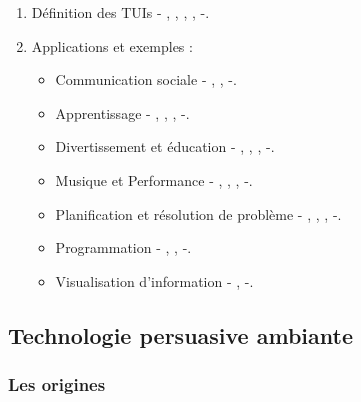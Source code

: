\documentclass[10pt,a5paper,twoside]{article}
\begin{document}
\begin{enumerate}
\def\labelenumi{\arabic{enumi}.}
\item
  Définition des TUIs - \citet{wellner1993back},
  \citet{fitzmaurice1995bricks}, \citet{ishii1997tangible},
  \citet{ullmer2000emerging}, \citet{shaer2010tangible} -.
\item
  Applications et exemples :

  \begin{itemize}
  \itemsep1pt\parskip0pt
  \item
    Communication sociale - \citet{werner2008unitedpulse},
    \citet{ernevi2005interactive}, \citet{chang2001lumitouch} -.
  \item
    Apprentissage - \citet{zufferey2009tinkerSheets},
    \citet{underkoffler1998illuminatinglight}, \citet{raffle2004topobo},
    \citet{frei2000curlybot} -.
  \item
    Divertissement et éducation - \citet{zigelbaum2007tangible},
    \citet{ryokai2004iobrush}, \citet{frey2014teegi},
    \citet{gervais2015tobe} -.
  \item
    Musique et Performance - \citet{jorda2007reactable},
    \citet{schiettecatte2008audiocubes}, \citet{patten2002audiopad},
    \citet{newton2003block} -.
  \item
    Planification et résolution de problème - \citet{ishii2008tangible},
    \citet{underkoffler1999urp}, \citet{patten2007mechanical},
    \citet{jacob2002tangible} -.
  \item
    Programmation - \citet{suzuki1995interaction},
    \citet{horn2008tangible}, -.
  \item
    Visualisation d'information - \citet{couture2008geotui},
    \citet{hinckley1994passive} -.
  \end{itemize}
\end{enumerate}

\subsection{Technologie persuasive
ambiante}\label{technologie-persuasive-ambiante}

\subsubsection{Les origines}\label{les-origines}
\end{document}

